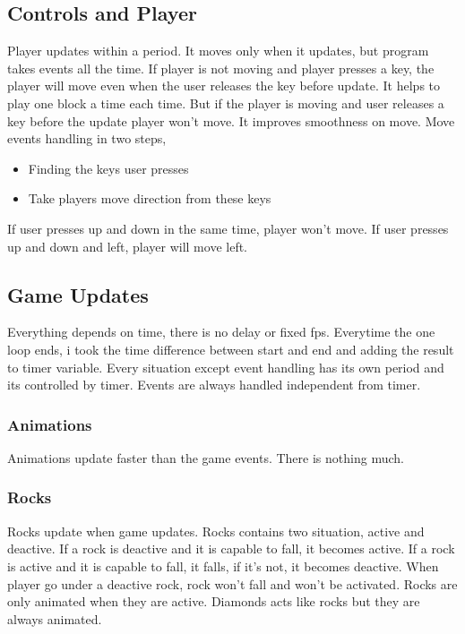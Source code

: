 \documentclass[letterpaper,10pt,english]{sphinxmanual}
\begin{document}
\subsection{Controls and Player}
\label{\detokenize{player:controls-and-player}}
Player updates within a period. It moves only when it updates, but program takes
events all the time. If player is not moving and player presses a key, the player
will move even when the user releases the key before update. It helps to play one
block a time each time. But if the player is moving and user releases a key before
the update player won’t move. It improves smoothness on move.
Move events handling in two steps,
\begin{itemize}
\item {} 
Finding the keys user presses

\item {} 
Take players move direction from these keys

\end{itemize}

If user presses up and down in the same time, player won’t move. If user presses up
and down and left, player will move left.


\subsection{Game Updates}
\label{\detokenize{player:game-updates}}
Everything depends on time, there is no delay or fixed fps. Everytime the one loop ends,
i took the time difference between start and end and adding the result to timer variable.
Every situation except event handling has its own period and its controlled by timer.
Events are always handled independent from timer.


\subsubsection{Animations}
\label{\detokenize{player:animations}}
Animations update faster than the game events. There is nothing much.


\subsubsection{Rocks}
\label{\detokenize{player:rocks}}
Rocks update when game updates. Rocks contains two situation, active and deactive.
If a rock is deactive and it is capable to fall, it becomes active.
If a rock is active and it is capable to fall, it falls, if it’s not, it becomes deactive.
When player go under a deactive rock, rock won’t fall and won’t be activated.
Rocks are only animated when they are active.
Diamonds acts like rocks but they are always animated.
\end{document}
